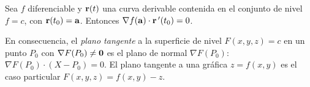 \begin{teorema}\label{teo:gradiente-normal}
Sea $f$ diferenciable y $\mathbf{r}(t)$ una curva derivable contenida en el conjunto de nivel $f=c$, con $\mathbf{r}(t_0)=\mathbf{a}$. Entonces $\nabla f(\mathbf{a})\cdot\mathbf{r}\,'(t_0)=0$.
\end{teorema}

En consecuencia, el \emph{plano tangente} a la superficie de nivel $F(x,y,z)=c$ en un punto $P_0$ con $\nabla F(P_0)\neq\mathbf{0}$ es el plano de normal $\nabla F(P_0)$: $\nabla F(P_0)\cdot(X-P_0)=0$. El plano tangente a una gráfica $z=f(x,y)$ es el caso particular $F(x,y,z)=f(x,y)-z$.

\addtocounter{definicion}{1}%

\addtocounter{definicion}{1}%

\addtocounter{definicion}{1}%

